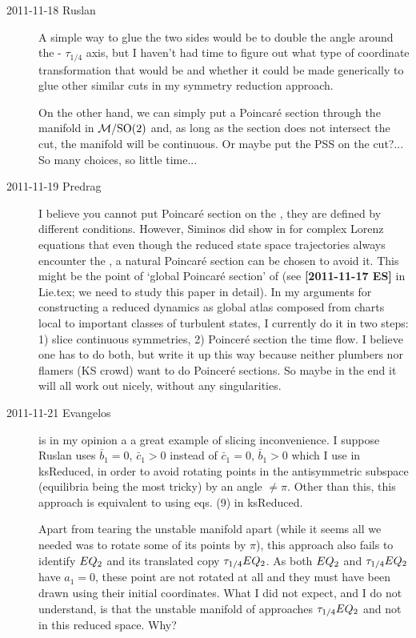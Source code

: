 \begin{description}
\item[2011-11-18 Ruslan]
    A simple way to glue the two sides would be to double the angle
    around the  - $\tau_{1/4}$  axis, but I haven't had
    time to figure out what type of coordinate transformation that would
    be and whether it could be made generically to glue other similar
    cuts in my symmetry reduction approach.

    On the other hand, we can simply put a Poincar\'e section through the
    manifold in ${\cal M}/\textrm{SO}(2)$ and, as long as the section does not intersect
    the cut, the manifold will be continuous.  Or maybe put the PSS on
    the cut?...  So many choices, so little time...

\item[2011-11-19 Predrag] I believe you cannot put Poincar\'e section on
the \sset, they are defined by different conditions. However, Siminos did
show in  for complex Lorenz equations that even though
the reduced state space trajectories always encounter the \sset, a natural
Poincar\'e section can be chosen to avoid it. This might be the point of
`global Poincar\'{e} section' of  (see {\bf [2011-11-17
ES] } in Lie.tex; we need to study this paper in detail). In my
arguments for constructing a reduced dynamics as global atlas
composed from charts local to important classes of turbulent states, I
currently do it in two steps: 1) slice continuous symmetries, 2)
Poincer\'e section the time flow. I believe one has to do both, but write
it up this way because neither plumbers nor flamers (KS crowd) want to do
Poincer\'e sections. So maybe in the end it will all work out nicely,
without any singularities.

\item[2011-11-21 Evangelos]  is in my opinion a
a great example of slicing inconvenience. I suppose Ruslan uses
$\bar{b}_1 = 0$, $\bar{c}_1 > 0$ instead of $\bar{c}_1 = 0$, $\bar{b}_1 > 0$
which I use in ksReduced, in order to avoid rotating points in the antisymmetric
subspace (equilibria being the most tricky) by an angle $\neq \pi$.
Other than this, this approach is equivalent to using eqs. (9) in ksReduced.

Apart from tearing the unstable manifold apart (while it seems all we needed
was to rotate some of its points by $\pi$), this approach also fails to identify
$EQ_{2}$ and its translated copy $\tau_{1/4}EQ_{2}$. As both $EQ_{2}$ and
$\tau_{1/4}EQ_{2}$ have $a_1=0$, these point are not rotated at all and they must
have been drawn using their initial coordinates. What I did not expect,
and I do not understand, is that the unstable manifold of 
approaches $\tau_{1/4}EQ_{2}$ and not  in this reduced space. Why?


\end{description}
